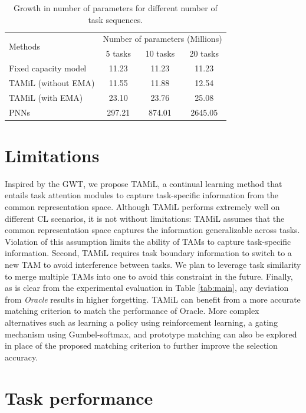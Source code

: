 \documentclass{article} %
\begin{document}
\begin{table}
\centering
\caption{Growth in number of parameters for different number of task sequences.} 
\label{tab:parameter}
\begin{tabular}{l|ccc}
\toprule
 \multirow{2}{*}{Methods} & \multicolumn{3}{c}{Number of parameters (Millions)} \\  \cmidrule{2-4}
  & 5 tasks & 10 tasks  & 20 tasks  \\ \midrule
Fixed capacity model & 11.23 & 11.23 & 11.23  \\
TAMiL (without EMA) & 11.55 & 11.88 & 12.54  \\
TAMiL (with EMA) & 23.10 & 23.76 & 25.08  \\
PNNs & 297.21 & 874.01 & 2645.05 \\
\bottomrule
\end{tabular}
\end{table}


\section{Limitations}
 Inspired by the GWT, we propose TAMiL, a continual learning method that entails task attention modules to capture task-specific information from the common representation space. Although TAMiL performs extremely well on different CL scenarios, it is not without limitations: TAMiL assumes that the common representation space captures the information generalizable across tasks. Violation of this assumption limits the ability of TAMs to capture task-specific information. Second, TAMiL requires task boundary information to switch to a new TAM to avoid interference between tasks. We plan to leverage task similarity to merge multiple TAMs into one to avoid this constraint in the future. Finally, as is clear from the experimental evaluation in Table \ref{tab:main}, any deviation from \textit{Oracle} results in higher forgetting. TAMiL can benefit from a more accurate matching criterion to match the performance of Oracle. More complex alternatives such as learning a policy using reinforcement learning, a gating mechanism using Gumbel-softmax, and prototype matching can also be explored in place of the proposed matching criterion to further improve the selection accuracy. 


\section{Task performance}
\end{document}
